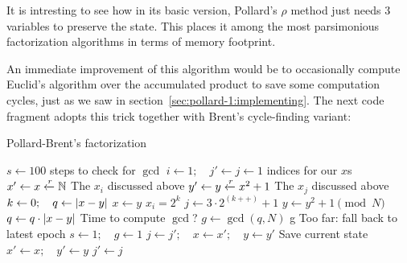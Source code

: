 \begin{remark}
  It is intresting to see how in its basic version, Pollard's $\rho$
  method just needs 3 variables  to preserve the
  state. This places it among the most parsimonious factorization algorithms in
  terms of memory footprint.
\end{remark}

An immediate improvement of this algorithm would be to occasionally compute Euclid's
algorithm over the accumulated product to save some computation cycles, just as
we saw in section~\ref{sec:pollard-1:implementing}. The next code fragment
adopts this trick together with Brent's cycle-finding variant:

\begin{algorithm}
  \caption{Pollard-Brent's factorization \label{alg:pollardrho}}
  \begin{algorithmic}[1]
    \State $s \gets 100$
    \Comment steps to check for $\gcd$
    \State $i \gets 1; \quad j' \gets j \gets 1$
    \Comment indices for our $x$s
    \State $x' \gets x \xleftarrow{r} \mathbb{N}$
    \Comment The $x_i$ discussed above
    \State $y' \gets y \xleftarrow{r} x^2 + 1$
    \Comment The $x_j$ discussed above
    \State $k \gets 0; \quad q \gets \left|x-y\right|$
      \State $x \gets y$ \Comment $x_i = 2^k$
      \State $j \gets 3 \cdot 2^{(k++)} + 1$
        \State $y \gets y^2 + 1 \pmod{N}$
        \State $q \gets q \cdot \left|x - y\right|$
         \Comment Time to compute $\gcd$?
          \State $g \gets \gcd(q, N)$
           \Return g \EndIf
            \Comment Too far: fall back to latest epoch
            \State $s \gets 1; \quad  g \gets 1$
            \State $j \gets j'; \quad x \gets x'; \quad y \gets y'$
          \Else
            \Comment Save current state
            \State $x' \gets x; \quad y' \gets y$
            \State $j' \gets j$
          \EndIf
        \EndIf
      \EndWhile
    \EndWhile
  \end{algorithmic}
\end{algorithm}

